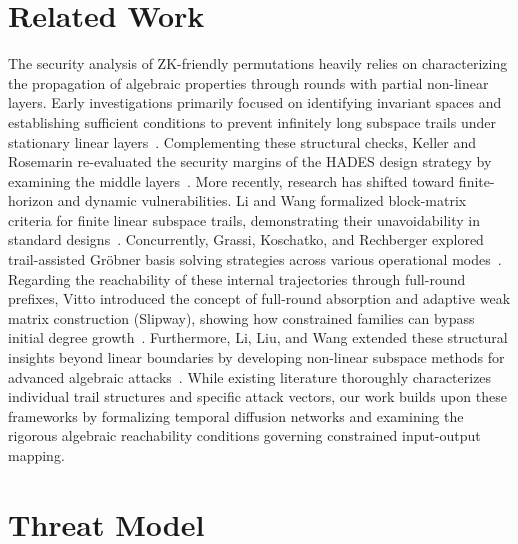 \documentclass[conference]{IEEEtran}
\theoremstyle{definition}
\theoremstyle{plain}
\begin{document}
\section{Related Work}
\label{sec:related}

The security analysis of ZK-friendly permutations heavily relies on characterizing the propagation of algebraic properties through rounds with partial non-linear layers. Early investigations primarily focused on identifying invariant spaces and establishing sufficient conditions to prevent infinitely long subspace trails under stationary linear layers~\cite{weaklayers2020, algebraiccrypt2023}. Complementing these structural checks, Keller and Rosemarin re-evaluated the security margins of the HADES design strategy by examining the middle layers~\cite{mindthemiddle2021}. More recently, research has shifted toward finite-horizon and dynamic vulnerabilities. Li and Wang formalized block-matrix criteria for finite linear subspace trails, demonstrating their unavoidability in standard designs~\cite{cryptoeprint:2026/967}. Concurrently, Grassi, Koschatko, and Rechberger explored trail-assisted Gröbner basis solving strategies across various operational modes~\cite{poseidonneptune2025}. Regarding the reachability of these internal trajectories through full-round prefixes, Vitto introduced the concept of full-round absorption and adaptive weak matrix construction (Slipway), showing how constrained families can bypass initial degree growth~\cite{slipway2026}. Furthermore, Li, Liu, and Wang extended these structural insights beyond linear boundaries by developing non-linear subspace methods for advanced algebraic attacks~\cite{nonlinear2026}. While existing literature thoroughly characterizes individual trail structures and specific attack vectors, our work builds upon these frameworks by formalizing temporal diffusion networks and examining the rigorous algebraic reachability conditions governing constrained input-output mapping.


\section{Threat Model}
\label{sec:model}
\end{document}
